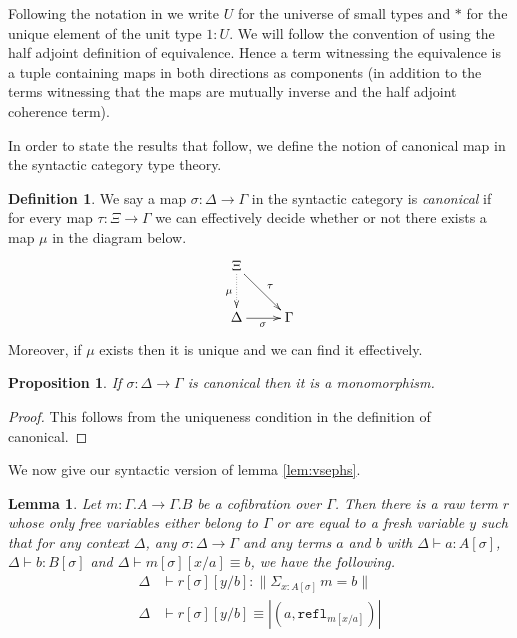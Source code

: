 \documentclass[a4paper]{amsart}
\newtheorem{proposition}[theorem]{Proposition}
\newtheorem{lemma}[theorem]{Lemma}
\theoremstyle{definition}
\newtheorem{definition}[theorem]{Definition}
\newcommand{\refl}{\mathtt{refl}}
\begin{document}
Following the notation in \cite{hottbook} we write
$U$ for the universe of small types and $\ast$ for the unique element
of the unit type $1 : U$. We will follow the convention of using the
half adjoint definition of equivalence. Hence a term witnessing the
equivalence is a tuple containing maps in both directions as
components (in addition to the terms witnessing that the maps
are mutually inverse and the half adjoint coherence term).

In order to state the results that follow, we define the notion of
canonical map in the syntactic category type theory.
\begin{definition}
  We say a map $\sigma \colon \Delta \to \Gamma$ in the syntactic
  category is \emph{canonical} if for every map
  $\tau \colon \Xi \to \Gamma$ we can effectively decide whether or
  not there exists a map $\mu$ in the diagram below.
  \begin{equation*}
    \xymatrix{\Xi \ar@{.>}[d]_\mu \ar[dr]^\tau & \\
      \Delta \ar[r]_\sigma & \Gamma}
  \end{equation*}
  Moreover, if $\mu$ exists then it is unique and we can find it
  effectively.
\end{definition}

\begin{proposition}
  \label{prop:canontomonic}
  If $\sigma \colon \Delta \to \Gamma$ is canonical then it is a
  monomorphism.
\end{proposition}

\begin{proof}
  This follows from the uniqueness condition in the definition of
  canonical.
\end{proof}

We now give our syntactic version of lemma \ref{lem:vsephs}.
\begin{lemma}
  \label{lem:syntaxlem}
  Let $m \colon \Gamma.A \to \Gamma.B$ be a cofibration over
  $\Gamma$. Then there is a raw term $r$ whose only free variables
  either belong to $\Gamma$ or are equal to a fresh variable $y$ such
  that for any context $\Delta$, any $\sigma \colon \Delta \to \Gamma$
  and any terms $a$ and $b$ with $\Delta \vdash a : A[\sigma]$,
  $\Delta \vdash b : B[\sigma]$ and $\Delta \vdash m[\sigma][x/a]
  \equiv b$, we have the following.
  \begin{align}
    \Delta &\vdash r[\sigma][y/b] : \| \Sigma_{x : A[\sigma]} \, m =
             b \| \label{eq:syntaxlemvalid} \\
    \Delta &\vdash r[\sigma][y/b] \equiv | (a, \refl_{m[x/a]})
             | \label{eq:syntaxlemeq}
  \end{align}
\end{lemma}
\end{document}
